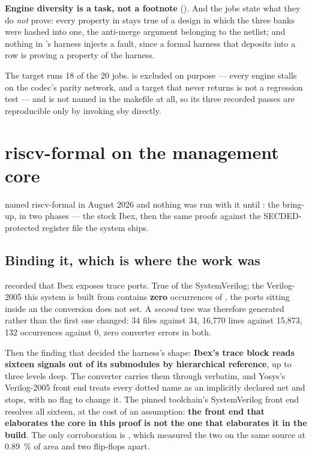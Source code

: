 \textbf{Engine diversity is a task, not a footnote} (). And the jobs state what they do \emph{not} prove: every property in  stays true of a design in which the three banks were hashed into one, the anti-merge argument belonging to the netlist; and nothing in 's harness injects a fault, since a formal harness that deposits into a row is proving a property of the harness.

The  target runs 18 of the 20 jobs.  is excluded on purpose --- every engine stalls on the codec's parity network, and a target that never returns is not a regression test --- and  is not named in the makefile at all, so its three recorded passes are reproducible only by invoking sby directly.

\section{riscv-formal on the management core}
\label{sec:verif-rvf}

 named riscv-formal in August 2026 and nothing was run with it until : the bring-up, in two phases --- the stock Ibex, then the same proofs against the SECDED-protected register file the system ships.

\subsection{Binding it, which is where the work was}

 recorded that Ibex exposes trace ports. True of the SystemVerilog; the Verilog-2005 this system is built from contains \textbf{zero} occurrences of , the ports sitting inside an  the conversion does not set. A \emph{second} tree was therefore generated rather than the first one changed: 34 files against 34, 16,770 lines against 15,873, 132  occurrences against 0, zero converter errors in both.

Then the finding that decided the harness's shape: \textbf{Ibex's trace
block reads sixteen signals out of its submodules by hierarchical
reference}, up to three levels deep. The converter carries them through verbatim, and Yosys's Verilog-2005 front end treats every dotted name as an implicitly declared net and stops, with no flag to change it. The pinned toolchain's SystemVerilog front end resolves all sixteen, at the cost of an assumption: \textbf{the front end that elaborates the core in
this proof is not the one that elaborates it in the build}. The only
corroboration is , which measured the two on the
same source at \SI{0.89}{\percent} of area and two flip-flops apart.

